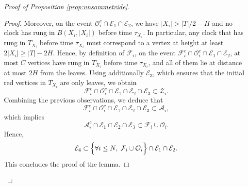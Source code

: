 \documentclass[french]{article}
\newcommand{\Tf}{T}
\renewcommand{\1}{\mathds{1}}
\begin{document}
\begin{proof}[Proof of Proposition \ref{prop:unsommetvide}]
\begin{proof}
Moreover, on the event $\mathcal{O}_i^c \cap \mathcal{E}_1 \cap \mathcal{E}_2$, we have $|X_i|>|\Tf|/2-H$ and no clock has rung in $B(X_i,|X_i|)$ before time $\tau_{X_i}$. In particular, any clock that has rung in $\Tf_{X_i}$ before time $\tau_{X_i}$ must correspond to a vertex at height at least $2|X_i|\ge |\Tf|-2H$.
Hence, by definition of $\mathcal{F}_i$, on the event
$\mathcal{F}_i^c \cap \mathcal{O}_i^c \cap \mathcal{E}_1 \cap \mathcal{E}_2$,
at most $C$ vertices have rung in $\Tf_{X_i}$ before time $\tau_{X_i}$, and all of them lie at distance at most $2H$ from the leaves. Using additionally $\mathcal{E}_3$, which ensures that the initial red vertices in $\Tf_{X_i}$ are only leaves, we obtain
$$
\mathcal{F}_i^c \cap \mathcal{O}_i^c \cap \mathcal{E}_1 \cap \mathcal{E}_2 \cap \mathcal{E}_3
\subset \mathcal{Z}_i.
$$
Combining the previous observations, we deduce that
$$
\mathcal{F}_i^c \cap \mathcal{O}_i^c \cap \mathcal{E}_1 \cap \mathcal{E}_2 \cap \mathcal{E}_3
\subset \mathcal{A}_i,
$$
which implies
$$
\mathcal{A}_i^c \cap \mathcal{E}_1 \cap \mathcal{E}_2 \cap \mathcal{E}_3
\subset \mathcal{F}_i \cup \mathcal{O}_i.
$$
Hence,
$$
\mathcal{E}_4 \subset \Bigl\{\forall i \le N,\; \mathcal{F}_i \cup \mathcal{O}_i\Bigr\} \cap \mathcal{E}_1 \cap \mathcal{E}_2.
$$
This concludes the proof of the lemma.
\end{proof}


\end{proof}
\end{document}
